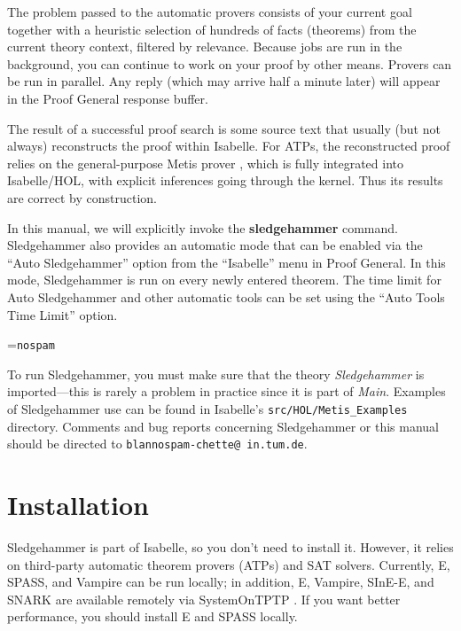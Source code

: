 \documentclass[a4paper,12pt]{article}
\begin{document}
The problem passed to the automatic provers consists of your current goal
together with a heuristic selection of hundreds of facts (theorems) from the
current theory context, filtered by relevance. Because jobs are run in the
background, you can continue to work on your proof by other means. Provers can
be run in parallel. Any reply (which may arrive half a minute later) will appear
in the Proof General response buffer.

The result of a successful proof search is some source text that usually (but
not always) reconstructs the proof within Isabelle. For ATPs, the reconstructed
proof relies on the general-purpose Metis prover \cite{metis}, which is fully
integrated into Isabelle/HOL, with explicit inferences going through the kernel.
Thus its results are correct by construction.

In this manual, we will explicitly invoke the \textbf{sledgehammer} command.
Sledgehammer also provides an automatic mode that can be enabled via the
``Auto Sledgehammer'' option from the ``Isabelle'' menu in Proof General. In
this mode, Sledgehammer is run on every newly entered theorem. The time limit
for Auto Sledgehammer and other automatic tools can be set using the ``Auto
Tools Time Limit'' option.

\newbox\boxA
\setbox\boxA=\hbox{\texttt{nospam}}

To run Sledgehammer, you must make sure that the theory \textit{Sledgehammer} is
imported---this is rarely a problem in practice since it is part of
\textit{Main}. Examples of Sledgehammer use can be found in Isabelle's
\texttt{src/HOL/Metis\_Examples} directory.
Comments and bug reports concerning Sledgehammer or this manual should be
directed to
\texttt{blan{\color{white}nospam}\kern-\wd\boxA{}chette@\allowbreak
in.\allowbreak tum.\allowbreak de}.

\smallskipamount


\section{Installation}
\label{installation}

Sledgehammer is part of Isabelle, so you don't need to install it. However, it
relies on third-party automatic theorem provers (ATPs) and SAT solvers.
Currently, E, SPASS, and Vampire can be run locally; in addition, E, Vampire,
SInE-E, and SNARK are available remotely via SystemOnTPTP \cite{sutcliffe-2000}.
If you want better performance, you should install E and SPASS locally.
\end{document}
